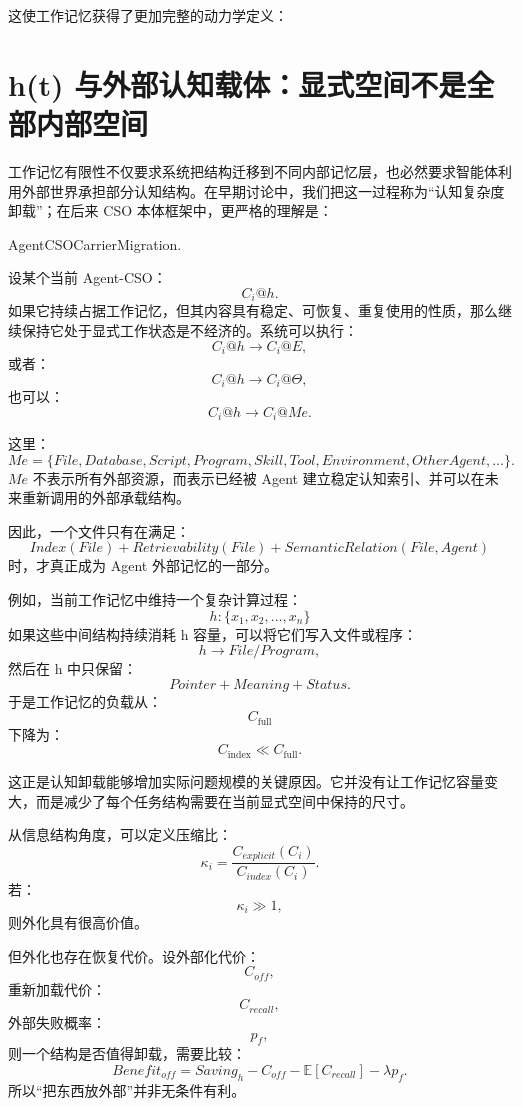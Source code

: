 这使工作记忆获得了更加完整的动力学定义：
\begin{statementbox}
\centering
{}
\end{statementbox}

\section{h(t) 与外部认知载体：显式空间不是全部内部空间}

工作记忆有限性不仅要求系统把结构迁移到不同内部记忆层，也必然要求智能体利用外部世界承担部分认知结构。在早期讨论中，我们把这一过程称为“认知复杂度卸载”；在后来 CSO 本体框架中，更严格的理解是：
\begin{statementbox}
AgentCSOCarrierMigration.
\end{statementbox}

设某个当前 Agent-CSO：
\[
C_i@h.
\]
如果它持续占据工作记忆，但其内容具有稳定、可恢复、重复使用的性质，那么继续保持它处于显式工作状态是不经济的。系统可以执行：
\[
C_i@h
\rightarrow
C_i@E,
\]
或者：
\[
C_i@h
\rightarrow
C_i@\Theta,
\]
也可以：
\[
C_i@h
\rightarrow
C_i@Me.
\]

这里：
\[
Me
=
\{
File,
Database,
Script,
Program,
Skill,
Tool,
Environment,
OtherAgent,
\ldots
\}.
\]
$Me$ 不表示所有外部资源，而表示已经被 Agent 建立稳定认知索引、并可以在未来重新调用的外部承载结构。

因此，一个文件只有在满足：
\[
Index(File)
+
Retrievability(File)
+
SemanticRelation(File,Agent)
\]
时，才真正成为 Agent 外部记忆的一部分。

例如，当前工作记忆中维持一个复杂计算过程：
\[
h:
\{x_1,x_2,\dots,x_n\}
\]
如果这些中间结构持续消耗 h 容量，可以将它们写入文件或程序：
\[
h
\rightarrow
File/Program,
\]
然后在 h 中只保留：
\[
Pointer+
Meaning+
Status.
\]
于是工作记忆的负载从：
\[
C_{\mathrm{full}}
\]
下降为：
\[
C_{\mathrm{index}}
\ll
C_{\mathrm{full}}.
\]

这正是认知卸载能够增加实际问题规模的关键原因。它并没有让工作记忆容量变大，而是减少了每个任务结构需要在当前显式空间中保持的尺寸。

从信息结构角度，可以定义压缩比：
\[
\kappa_i
=
\frac{C_{explicit}(C_i)}
{C_{index}(C_i)}.
\]
若：
\[
\kappa_i\gg1,
\]
则外化具有很高价值。

但外化也存在恢复代价。设外部化代价：
\[
C_{off},
\]
重新加载代价：
\[
C_{recall},
\]
外部失败概率：
\[
p_f,
\]
则一个结构是否值得卸载，需要比较：
\[
Benefit_{off}
=
Saving_h
-
C_{off}
-
\mathbb E[C_{recall}]
-
\lambda p_f.
\]
所以“把东西放外部”并非无条件有利。

